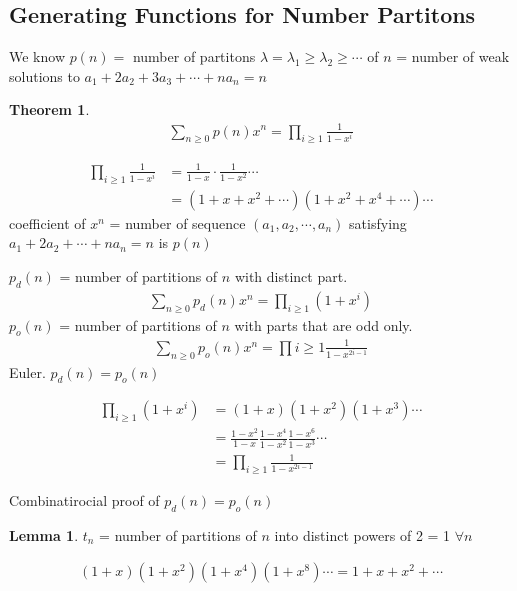 \documentclass{article}
\theoremstyle{definition}
\newtheorem{thm}{Theorem}[]
\newtheorem{lm}{Lemma}
\newenvironment{pf*}{\pushQED{\qed}\pf}{\popQED\endpf}
\begin{document}
\subsection{Generating Functions for Number Partitons}
We know $p(n) =$ number of partitons $\lambda = \lambda_1 \ge \lambda_2 
\ge \cdots$ of $n$ 
= number of weak solutions to $a_1 + 2a_2 +3a_3 + \cdots + n a_n = n$
\begin{thm}
    \begin{align*}
        \sum_{n \ge 0} p(n) x^n = \prod_{i \ge 1} \frac{1}{1-x^i} 
    \end{align*}
\end{thm}
\begin{pf*}
    \begin{align*}
        \prod_{i\ge 1} \frac{1}{1-x^i} &= \frac{1}{1-x} \cdot \frac{1}{1-x^2} \cdots \\ 
        &= (1+x+x^2+\cdots ) (1+ x^2 +x^4 + \cdots ) \cdots 
    \end{align*}
    coefficient of $x^n$ = number of sequence $(a_1, a_2, \cdots, a_n)$ 
    satisfying $a_1 + 2a_2 + \cdots + na_n = n$ is $p(n)$
\end{pf*}
$p_d (n)$ = number of partitions of $n$ with distinct part.
\begin{align*}
    \sum_{n\ge 0} p_d (n) x^n = \prod_{i \ge 1} (1+ x^i)
\end{align*}
$p_o (n)$ = number of partitions of $n$ with parts that are odd only. 
\begin{align*}
    \sum_{n \ge 0} p_o (n) x^n = \prod{i \ge 1} \frac{1}{1- x^{2i - 1}}
\end{align*}
Euler. $p_d (n) = p_o (n)$
\begin{pf*}
    \begin{align*}
        \prod_{i\ge 1 } (1+x^i) &= (1+x) (1+ x^2) ( 1+ x^3) \cdots \\ 
        &= \frac{1-x^2}{1-x} \frac{1-x^4}{1-x^2} \frac{1-x^6}{1-x^3} \cdots \\ 
        &= \prod_{i\ge 1} \frac{1}{1-x^{2i-1}} 
    \end{align*}
\end{pf*}
Combinatirocial proof of $p_d (n) = p_o (n)$
\begin{lm}
    $t_n$ = number of partitions of $n$ into distinct powers of 2 = 1 $\forall n$
\end{lm}
\begin{pf*}
    \begin{align*}
        (1+x) (1+x^2) (1+x^4) (1+x^8) \cdots = 1 + x + x^2 + \cdots 
    \end{align*}
\end{pf*}
\end{document}
